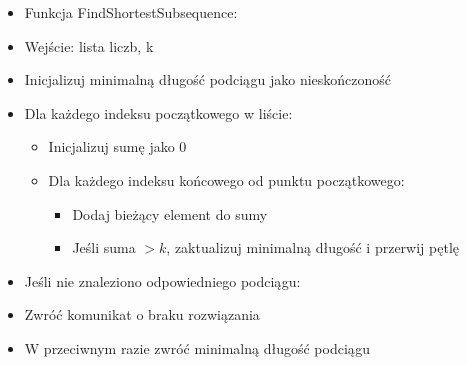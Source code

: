 \documentclass[12pt,twoside]{article}
\begin{document}
\begin{itemize}
  \item Funkcja FindShortestSubsequence:
  \item Wejście: lista liczb, k
  \item Inicjalizuj minimalną długość podciągu jako nieskończoność
  \item Dla każdego indeksu początkowego w liście:
  \begin{itemize}
      \item Inicjalizuj sumę jako 0
      \item Dla każdego indeksu końcowego od punktu początkowego:
      \begin{itemize}
          \item Dodaj bieżący element do sumy
          \item Jeśli suma $> k$, zaktualizuj minimalną długość i przerwij pętlę
      \end{itemize}
  \end{itemize}
  \item Jeśli nie znaleziono odpowiedniego podciągu:
  \item Zwróć komunikat o braku rozwiązania
  \item W przeciwnym razie zwróć minimalną długość podciągu
\end{itemize}
\end{document}
